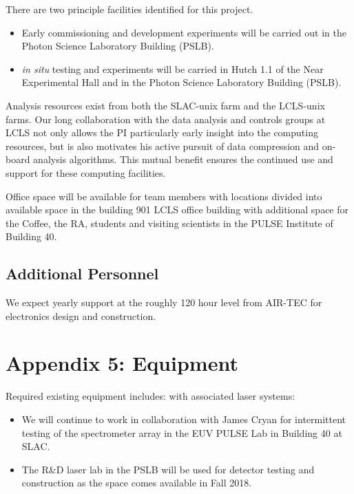 There are two principle facilities identified for this project.
\begin{itemize}
\item Early commissioning and development experiments will be carried out in the Photon Science Laboratory Building (PSLB).
\item \textit{in situ} testing and experiments will be carried in Hutch 1.1 of the Near Experimental Hall and in the Photon Science Laboratory Building (PSLB).
\end{itemize}

Analysis resources exist from both the SLAC-unix farm and the LCLS-unix farms.  
Our long collaboration with the data analysis and controls groups at LCLS not only allows the PI particularly early insight into the computing resources, but is also motivates his active pursuit of data compression and on-board analysis algorithms.
This mutual benefit ensures the continued use and support for these computing facilities.

Office space will be available for team members with locations divided into available space in the building 901 LCLS office building with additional space for the Coffee, the RA, students and visiting scientists in the PULSE Institute of Building 40.

\subsection*{Additional Personnel}%

We expect yearly support at the roughly 120 hour level from AIR-TEC for electronics design and construction.

\clearpage
\appendix
\section*{Appendix 5: Equipment}

Required existing equipment includes:
\vspace{\baselineskip}
with associated laser systems: 
\begin{itemize}
\item We will continue to work in collaboration with James Cryan for intermittent testing of the spectrometer array in the EUV PULSE Lab in Building 40 at SLAC.
\item The R\&D laser lab in the PSLB will be used for detector testing and construction as the space comes available in Fall 2018.
\end{itemize}
\vspace{\baselineskip}

